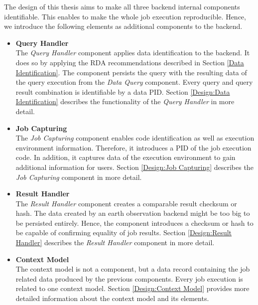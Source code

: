 \documentclass[draft,final]{vutinfth} %
\begin{document}
The design of this thesis aims to make all three backend internal components identifiable. This enables to make the whole job execution reproducible. Hence, we introduce the following elements as additional components to the backend.

 \begin{itemize}
	\item \textbf{Query Handler} \\
	The \textit{Query Handler} component applies data identification to the backend. It does so by applying the RDA recommendations described in Section \ref{Data Identification}. The component persists the query with the resulting data of the query execution from the \textit{Data Query} component. Every query and query result combination is identifiable by a data PID. Section \ref{Design:Data Identification} describes the functionality of the \textit{Query Handler} in more detail.     
	\item \textbf{Job Capturing} \\ 
	The \textit{Job Capturing} component enables code identification as well as execution environment information. Therefore, it introduces a PID of the job execution code. In addition, it captures data of the execution environment to gain additional information for users. Section \ref{Design:Job Capturing} describes the \textit{Job Capturing} component in more detail.
	\item \textbf{Result Handler} \\
	The \textit{Result Handler} component creates a comparable result checksum or hash. The data created by an earth observation backend might be too big to be persisted entirely. Hence, the component introduces a checksum or hash to be capable of confirming equality of job results. Section \ref{Design:Result Handler} describes the \textit{Result Handler} component in more detail.   
	\item \textbf{Context Model} \\ 
	The context model is not a component, but a data record containing the job related data produced by the previous components. Every job execution is related to one context model. Section \ref{Design:Context Model} provides more detailed information about the context model and its elements. 
\end{itemize}
\end{document}
